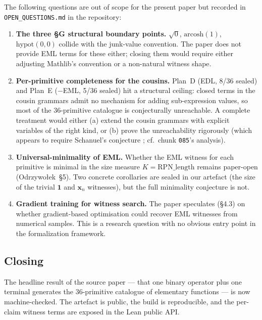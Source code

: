 \documentclass[11pt,a4paper]{article}
\theoremstyle{plain}
\theoremstyle{definition}
\begin{document}
The following questions are out of scope for the present paper but
recorded in \texttt{OPEN\_QUESTIONS.md} in the repository:

\begin{enumerate}[topsep=2pt, itemsep=2pt]
\item \textbf{The three §G structural boundary points.}
  $\sqrt{0}$, $\mathrm{arcosh}(1)$, $\mathrm{hypot}(0, 0)$ collide
  with the junk-value convention. The paper does not provide
  EML terms for these either; closing them would require either
  adjusting Mathlib's convention or a non-natural witness shape.

\item \textbf{Per-primitive completeness for the cousins.} Plan~D
  (EDL, 8/36 sealed) and Plan~E ($-\!$EML, 5/36 sealed) hit a
  structural ceiling: closed terms in the cousin grammars admit no
  mechanism for adding sub-expression values, so most of the
  $36$-primitive catalogue is conjecturally unreachable. A complete
  treatment would either (a) extend the cousin grammars with explicit
  variables of the right kind, or (b) prove the unreachability
  rigorously (which appears to require Schanuel's conjecture
  \cite{lang1966schanuel}; cf.~chunk \texttt{085}'s analysis).

\item \textbf{Universal-minimality of EML.} Whether the EML witness
  for each primitive is minimal in the size measure
  $K = \mathrm{RPN\_length}$ remains paper-open
  (Odrzywołek~\S5). Two concrete corollaries are sealed in our
  artefact (the size of the trivial $\mathbf{1}$ and $\mathbf{x}_n$
  witnesses), but the full minimality conjecture is not.

\item \textbf{Gradient training for witness search.} The paper
  speculates (\S4.3) on whether gradient-based optimisation could
  recover EML witnesses from numerical samples. This is a research
  question with no obvious entry point in the formalization
  framework.
\end{enumerate}

\subsection*{Closing}

The headline result of the source paper --- that one binary operator
plus one terminal generates the $36$-primitive catalogue of
elementary functions --- is now machine-checked. The artefact is
public, the build is reproducible, and the per-claim witness terms
are exposed in the Lean public API.
\end{document}

